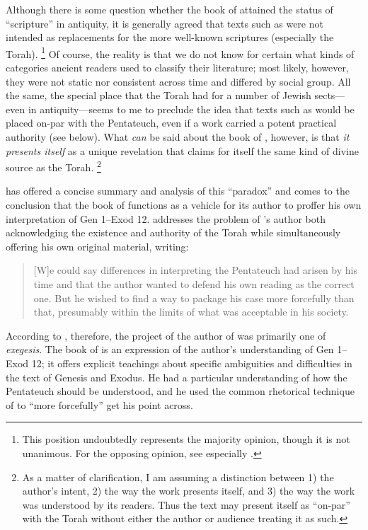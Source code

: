 Although there is some question whether the book of \jub attained the status of ``scripture'' in antiquity, it is generally agreed that \psgraphical texts such as \jub were not intended as replacements for the more well-known scriptures (especially the Torah).%
    \footnote{This position undoubtedly represents the majority opinion, though it is not unanimous. For the opposing opinion, see especially \cite{wacholder_kampen-etal1997}.}
Of course, the reality is that we do not know for certain what kinds of categories ancient readers used to classify their literature; most likely, however, they were not static nor consistent across time and differed by social group. All the same, the special place that the Torah had for a number of Jewish sects---even in antiquity---seems to me to preclude the idea that \psgraphical texts such as \jub would be placed on-par with the Pentateuch, even if a work carried a potent practical authority (see below). What \emph{can} be said about the book of \jub, however, is that \emph{it presents itself} as a unique revelation that claims for itself the same kind of divine source as the Torah.%
    \footnote{As a matter of clarification, I am assuming a distinction between 1) the author's intent, 2) the way the work presents itself, and 3) the way the work was understood by its readers. Thus the text may present itself as ``on-par'' with the Torah without either the author or audience treating it as such.}

\vanderkam has offered a concise summary and analysis of this ``\psgraphical paradox'' and comes to the conclusion that the book of \jub functions as a vehicle for its author to proffer his own interpretation of Gen 1--Exod 12. \vanderkam addresses the problem of \jub's author both acknowledging the existence and authority of the Torah while simultaneously offering his own original material, writing:

\begin{quote}
    [W]e could say differences in interpreting the Pentateuch had arisen by his time and that the author wanted to defend his own reading as the correct one. But he wished to find a way to package his case more forcefully than that, presumably within the limits of what was acceptable in his society.\autocite[28]{vanderkam_metso-etal2010}
\end{quote}

\noindent
According to \vanderkam, therefore, the project of the author of \jub was primarily one of \emph{exegesis}. The book of \jub is an expression of the author's understanding of Gen 1--Exod 12; it offers explicit teachings about specific ambiguities and difficulties in the text of Genesis and Exodus. He had a particular understanding of how the Pentateuch should be understood, and he used the common rhetorical technique of \psy to ``more forcefully'' get his point across.%
    \autocite[28]{vanderkam_metso-etal2010}

